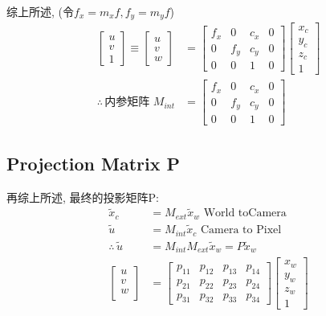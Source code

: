 综上所述, (令$f_x=m_xf, f_y=m_yf$)
\begin{align*}
    \begin{bmatrix}
        u\\v\\1
    \end{bmatrix}\equiv\begin{bmatrix}
        u\\v\\w
    \end{bmatrix}&=\begin{bmatrix}
        f_x & 0 & c_x & 0\\
        0&f_y&c_y&0\\
        0&0&1&0
    \end{bmatrix}\begin{bmatrix}
        x_c\\y_c\\z_c\\1
    \end{bmatrix}\\
    \therefore \,  \text{内参矩阵 } M_{int}&=\begin{bmatrix}
        f_x & 0 & c_x & 0\\
        0&f_y&c_y&0\\
        0&0&1&0
    \end{bmatrix}
\end{align*}

\subsection{Projection Matrix P}
再综上所述, 最终的投影矩阵P: 
\begin{align*}
    \tilde{x}_c&=M_{ext}\tilde{x}_w \text{  World toCamera}\\
    \tilde{u}&=M_{int}\tilde{x}_c \text{  Camera to Pixel}\\
    \therefore \,  \tilde{u}&=M_{int}M_{ext}\tilde{x}_w=P\tilde{x}_w\\
    \begin{bmatrix}
        u\\
        v\\
        w\\
    \end{bmatrix}&=\begin{bmatrix}
        p_{11} & p_{12} & p_{13} & p_{14} \\
        p_{21} & p_{22} & p_{23} & p_{24} \\
        p_{31} & p_{32} & p_{33} & p_{34}
    \end{bmatrix}\begin{bmatrix}
        x_w\\y_w\\z_w\\1
    \end{bmatrix}
\end{align*}

